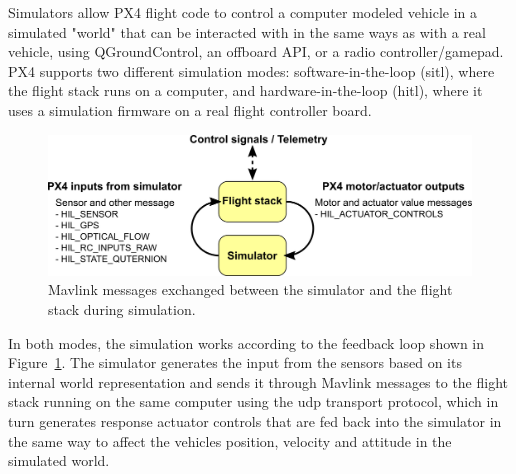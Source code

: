 Simulators allow PX4 flight code to control a computer modeled vehicle in a simulated "world" that can be interacted with in the same ways as with a real vehicle, using QGroundControl, an offboard API, or a radio controller/gamepad. PX4 supports two different simulation modes: software-in-the-loop (\gls{sitl}), where the flight stack runs on a computer, and hardware-in-the-loop (\gls{hitl}), where it uses a simulation firmware on a real flight controller board.
\begin{figure}
  \centering
  \includegraphics[width=\textwidth,keepaspectratio]{img/px4_simulator_messages.png}
  \caption{Mavlink messages exchanged between the simulator and the flight stack during simulation.}\label{fig:simulator-msgs}
\end{figure}
In both modes, the simulation works according to the feedback loop shown in Figure~\ref{fig:simulator-msgs}. 
The simulator generates the input from the sensors based on its internal world representation and sends it through Mavlink messages to the flight stack running on the same computer using the \gls{udp} transport protocol, which in turn generates response actuator controls that are fed back into the simulator in the same way to affect the vehicles position, velocity and attitude in the simulated world.

